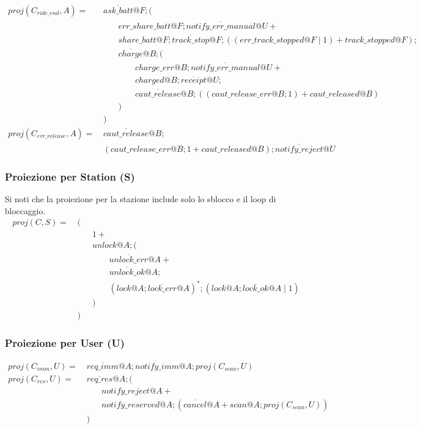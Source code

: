 \begin{align*}
proj(C_{ride\_end}, A) = & \ \overline{ask\_batt}@F ; ( \\
& \quad \quad err\_share\_batt@F ; \overline{notify\_err\_manual}@U + \\
& \quad \quad share\_batt@F ; \overline{track\_stop}@F ; ((err\_track\_stopped@F \mid 1) + track\_stopped@F) ; \\
& \quad \quad \overline{charge}@B ; ( \\
& \quad \quad \quad \quad charge\_err@B ; \overline{notify\_err\_manual}@U + \\
& \quad \quad \quad \quad charged@B ; \overline{receipt}@U ; \\
& \quad \quad \quad \quad \overline{caut\_release}@B ; ((caut\_release\_err@B ; 1) + caut\_released@B) \\
& \quad \quad ) \\
& \ ) \\
proj(C_{err\_release}, A) = & \ \overline{caut\_release}@B ; \\
& \ (caut\_release\_err@B ; 1 + caut\_released@B) ; \overline{notify\_reject}@U
\end{align*}

\subsubsection{Proiezione per Station (S)}

Si noti che la proiezione per la stazione include solo lo sblocco e il loop di
bloccaggio.\\

\begin{align*}
proj(C, S) = & \ ( \\
& \quad \quad 1 + \\
& \quad \quad unlock@A ; ( \\
& \quad \quad \quad \quad \overline{unlock\_err}@A + \\
& \quad \quad \quad \quad \overline{unlock\_ok}@A ; \\
& \quad \quad \quad \quad ( lock@A ; \overline{lock\_err}@A )^* ; ( lock@A ; \overline{lock\_ok}@A \mid 1 ) \\
& \quad \quad ) \\
& \ )
\end{align*}

\subsubsection{Proiezione per User (U)}
\begin{align*}
proj(C_{imm}, U) = & \ \overline{req\_imm}@A ; notify\_imm@A ; proj(C_{scan}, U) \\
proj(C_{res}, U) = & \ \overline{req\_res}@A ; ( \\
& \quad \quad notify\_reject@A + \\
& \quad \quad notify\_reserved@A ; (\overline{cancel}@A + \overline{scan}@A ; proj(C_{scan}, U)) \\
& \ )
\end{align*}

